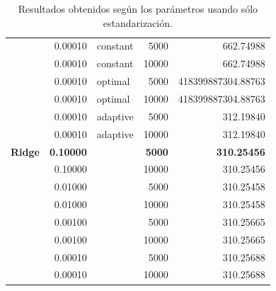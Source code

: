 \documentclass[a4paper, 20pt]{article}
\begin{document}
\begin{table}[h!]
\begin{tabular}{lrlrr}
                                 & 0.00010   & constant & 5000        & 662.74988          \\
                                 & 0.00010   & constant & 10000       & 662.74988          \\
                                 & 0.00010   & optimal  & 5000        & 418399887304.88763 \\
                                 & 0.00010   & optimal  & 10000       & 418399887304.88763 \\
                                 & 0.00010   & adaptive & 5000        & 312.19840          \\
                                 & 0.00010   & adaptive & 10000       & 312.19840          \\
\textbf{Ridge}                            & \textbf{0.10000}   &          & \textbf{5000}        & \textbf{310.25456}          \\
                                 & 0.10000   &          & 10000       & 310.25456          \\
                                 & 0.01000   &          & 5000        & 310.25458          \\
                                 & 0.01000   &          & 10000       & 310.25458          \\
                                 & 0.00100   &          & 5000        & 310.25665          \\
                                 & 0.00100   &          & 10000       & 310.25665          \\
                                 & 0.00010   &          & 5000        & 310.25688          \\
                                 & 0.00010   &          & 10000       & 310.25688         
\end{tabular}
\caption{Resultados obtenidos según los parámetros usando sólo estandarización.}
\end{table}
\end{document}

